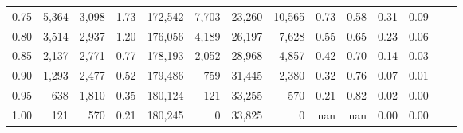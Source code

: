 \begin{tabular}{rrrrrrrrrrrrrr}
0.75 &   5,364 &  3,098 &    1.73 &  172,542 &    7,703 &  23,260 &  10,565 &  0.73 &  0.58 &  0.31 &      0.09 \\
0.80 &   3,514 &  2,937 &    1.20 &  176,056 &    4,189 &  26,197 &   7,628 &  0.55 &  0.65 &  0.23 &      0.06 \\
0.85 &   2,137 &  2,771 &    0.77 &  178,193 &    2,052 &  28,968 &   4,857 &  0.42 &  0.70 &  0.14 &      0.03 \\
0.90 &   1,293 &  2,477 &    0.52 &  179,486 &      759 &  31,445 &   2,380 &  0.32 &  0.76 &  0.07 &      0.01 \\
0.95 &     638 &  1,810 &    0.35 &  180,124 &      121 &  33,255 &     570 &  0.21 &  0.82 &  0.02 &      0.00 \\
1.00 &     121 &    570 &    0.21 &  180,245 &        0 &  33,825 &       0 &   nan &   nan &  0.00 &      0.00 \\
\bottomrule
\end{tabular}
